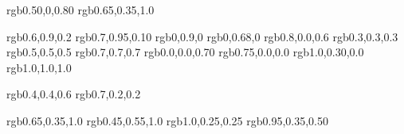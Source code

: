

\usepackage{color}
\usepackage{xcolor}
\definecolor{darkpurple}  {rgb}{0.50,0,0.80}      %
\definecolor{purple}      {rgb}{0.65,0.35,1.0}    %

\definecolor{spring}    {rgb}{0.6,0.9,0.2}    %
\definecolor{lime}      {rgb}{0.7,0.95,0.10}  %
\definecolor{fluorescentgreen}   {rgb}{0,0.9,0}        %
\definecolor{green}     {rgb}{0,0.68,0}       %
\definecolor{magenta}   {rgb}{0.8,0.0,0.6}    %
\definecolor{dgrey}     {rgb}{0.3,0.3,0.3}    %
\definecolor{grey}      {rgb}{0.5,0.5,0.5}    %
\definecolor{lgrey}     {rgb}{0.7,0.7,0.7}    %
\definecolor{darkblue}  {rgb}{0.0,0.0,0.70}   %
\definecolor{darkred}   {rgb}{0.75,0.0,0.0}   %
\definecolor{orangered} {rgb}{1.0,0.30,0.0}   %
\definecolor{white}     {rgb}{1.0,1.0,1.0}    %




\definecolor{oldcolor}   {rgb}{0.4,0.4,0.6}  %
\definecolor{usedcolor}  {rgb}{0.7,0.2,0.2}  %

\definecolor{jb1}            {rgb}{0.65,0.35,1.0}   %
\definecolor{jbn}            {rgb}{0.45,0.55,1.0}   %
%
\definecolor{gg}             {rgb}{1.0,0.25,0.25}     %
%
\definecolor{gs}             {rgb}{0.95,0.35,0.50}   %


